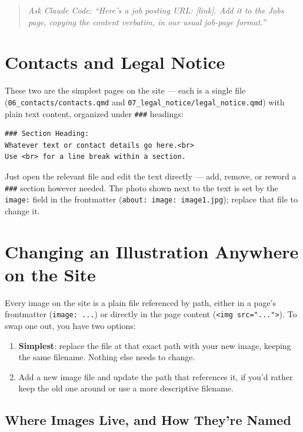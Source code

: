 \documentclass[11pt]{article}
\newcommand{\term}[1]{\textbf{#1}}
\newcommand{\file}[1]{\texttt{#1}}
\newcommand{\cmd}[1]{\texttt{#1}}
\begin{document}
\begin{quote}
\textit{Ask Claude Code: ``Here's a job posting URL: [link]. Add it to
the Jobs page, copying the content verbatim, in our usual job-page
format.''}
\end{quote}

\section{Contacts and Legal Notice}

These two are the simplest pages on the site --- each is a single file
(\file{06\_contacts/contacts.qmd} and
\file{07\_legal\_notice/legal\_notice.qmd}) with plain text content,
organized under \cmd{\#\#\#} headings:

\begin{lstlisting}
### Section Heading:
Whatever text or contact details go here.<br>
Use <br> for a line break within a section.
\end{lstlisting}

Just open the relevant file and edit the text directly --- add, remove,
or reword a \cmd{\#\#\#} section however needed. The photo shown next to
the text is set by the \file{image:} field in the frontmatter
(\file{about: image: image1.jpg}); replace that file to change it.

\section{Changing an Illustration Anywhere on the Site}

Every image on the site is a plain file referenced by path, either in a
page's frontmatter (\file{image: ...}) or directly in the page content
(\file{<img src="...">}). To swap one out, you have two options:

\begin{enumerate}
    \item \term{Simplest}: replace the file at that exact path with
    your new image, keeping the same filename. Nothing else needs to
    change.
    \item Add a new image file and update the path that references it,
    if you'd rather keep the old one around or use a more descriptive
    filename.
\end{enumerate}

\subsection{Where Images Live, and How They're Named}
\end{document}
